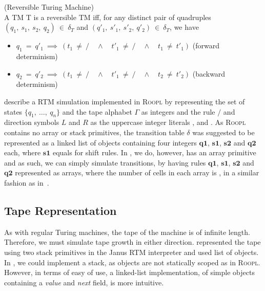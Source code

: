 \vspace{4mm}
\begin{definition}
    \label{def:reversible-tm}(Reversible Turing Machine)\vspace{4mm}\\
    \noindent A TM T is a reversible TM iff, for any distinct pair of quadruples $(q_1,\ s_1,\ s_2,\ q_2)\ \in\ \delta_T$ and $(q'_1,\ s'_1,\ s'_2,\ q'_2)\ \in\ \delta_T$, we have
    \begin{itemize}[label = {}, itemsep = 1pt]
        \item $q_1\ =\ q'_1\ \implies\ (t_1\ \neq\ / \quad \wedge \quad t'_1\ \neq\ / \quad \wedge \quad t_1\ \neq\ t'_1)$ (forward determinism)
        \item $q_2\ =\ q'_2\ \implies\ (t_1\ \neq\ / \quad \wedge \quad t'_1\ \neq\ / \quad \wedge \quad t_2\ \neq\ t'_2)$ (backward determinism)
    \end{itemize}
\end{definition}

\citeauthor{th:roopl} describe a RTM simulation implemented in \textsc{Roopl} by representing the set of states $\{q_1,\ \dots,\ q_n\}$ and the tape alphabet $\Gamma$ as integers and the rule $/$ and direction symbols $L$ and $R$ as the uppercase integer literals ,  and . As \textsc{Roopl} contains no array or stack primitives, the transition table $\delta$ was suggested to be represented as a linked list of objects containing four integers ${\textbf{q1}}$, ${\textbf{s1}}$, ${\textbf{s2}}$ and ${\textbf{q2}}$ each, where ${\textbf{s1}}$ equals  for shift rules. In \rooplpp, we do, however, has an array primitive and as such, we can simply simulate transitions, by having rules ${\textbf{q1}}$, ${\textbf{s1}}$, ${\textbf{s2}}$ and ${\textbf{q2}}$ represented as arrays, where the number of cells in each array is , in a similar fashion as in~\cite{ty:ejanus}.

\subsection{Tape Representation}
\label{subsec:tape-representation}
As with regular Turing machines, the tape of the machine is of infinite length. Therefore, we must simulate tape growth in either direction.
\citeauthor{ty:ejanus} represented the tape using two stack primitives in the Janus RTM interpreter and \citeauthor{th:roopl} used list of objects. In \rooplpp, we could implement a stack, as objects are not statically scoped as in \textsc{Roopl}. However, in terms of easy of use, a linked-list implementation, of simple objects containing a \textit{value} and \textit{next} field, is more intuitive.

